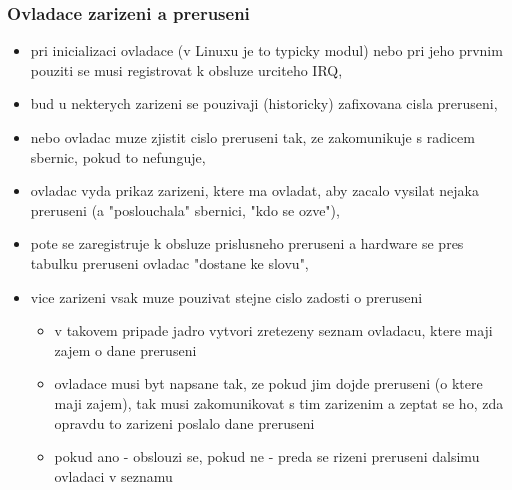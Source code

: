 \documentclass[a4paper, 11pt]{article}
\begin{document}
\subsubsection{Ovladace zarizeni a preruseni}
\begin{itemize}
    \item pri inicializaci ovladace (v Linuxu je to typicky modul) nebo pri jeho prvnim pouziti se musi registrovat k obsluze urciteho IRQ,
    \item bud u nekterych zarizeni se pouzivaji (historicky) zafixovana cisla preruseni,
    \item nebo ovladac muze zjistit cislo preruseni tak, ze zakomunikuje s radicem sbernic, pokud to nefunguje,
    \item ovladac vyda prikaz zarizeni, ktere ma ovladat, aby zacalo vysilat nejaka preruseni (a "poslouchala" sbernici, "kdo se ozve"),
    \item pote se zaregistruje k obsluze prislusneho preruseni a hardware se pres tabulku preruseni ovladac "dostane ke slovu",
    \item vice zarizeni vsak muze pouzivat stejne cislo zadosti o preruseni
    \begin{itemize}
        \item v takovem pripade jadro vytvori zretezeny seznam ovladacu, ktere maji zajem o dane preruseni
        \item ovladace musi byt napsane tak, ze pokud jim dojde preruseni (o ktere maji zajem), tak musi zakomunikovat s tim zarizenim a zeptat se ho, zda opravdu to zarizeni poslalo dane preruseni
        \item pokud ano - obslouzi se, pokud ne - preda se rizeni preruseni dalsimu ovladaci v seznamu \\
    \end{itemize}
\end{itemize}
\end{document}
